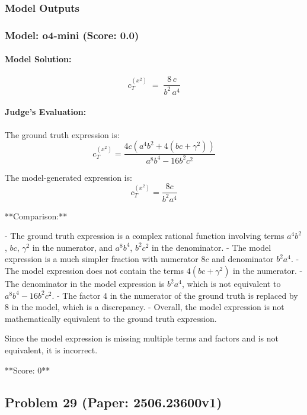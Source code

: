 \documentclass[10pt]{article}
\begin{document}
\subsubsection*{Model Outputs}
\subsubsection*{Model: o4-mini (Score: 0.0)}
\paragraph*{Model Solution:}
\[ c^{(x^2)}_T \;=\;\frac{8\,c}{b^2\,a^4} \]

\paragraph*{Judge's Evaluation:}

The ground truth expression is:
\[
c^{(x^2)}_T = \frac{4 c \left( a^4 b^2 + 4 (b c + \gamma^2) \right)}{a^8 b^4 - 16 b^2 c^2}
\]

The model-generated expression is:
\[
c^{(x^2)}_T = \frac{8 c}{b^2 a^4}
\]

**Comparison:**

- The ground truth expression is a complex rational function involving terms \(a^4 b^2\), \(b c\), \(\gamma^2\) in the numerator, and \(a^8 b^4\), \(b^2 c^2\) in the denominator.
- The model expression is a much simpler fraction with numerator \(8 c\) and denominator \(b^2 a^4\).
- The model expression does not contain the terms \(4 (b c + \gamma^2)\) in the numerator.
- The denominator in the model expression is \(b^2 a^4\), which is not equivalent to \(a^8 b^4 - 16 b^2 c^2\).
- The factor 4 in the numerator of the ground truth is replaced by 8 in the model, which is a discrepancy.
- Overall, the model expression is not mathematically equivalent to the ground truth expression.

Since the model expression is missing multiple terms and factors and is not equivalent, it is incorrect.

**Score: 0**

\newpage
\subsection*{Problem 29 (Paper: 2506.23600v1)}
\end{document}
